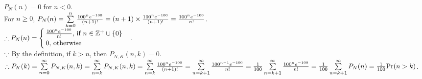 \begin{pr}
$P_N(n)=0$ for $n<0$.\\
For $n\geq0$, $P_N(n)=\sum\limits_{k=0}^n\frac{100^ne^{-100}}{(n+1)!}=(n+1)\times\frac{100^ne^{-100}}{(n+1)!}=\frac{100^ne^{-100}}{n!}$.\\
$\therefore P_N(n)=\begin{cases}
\frac{100^ne^{-100}}{n!}\text{, if }n\in\mathbb{Z}^+\cup\{0\}\\
0\text{, otherwise}
\end{cases}$.\\
$\because$ By the definition, if $k>n$, then $P_{N, K}(n, k)=0$.\\
$\therefore P_K(k)=\sum\limits_{n=0}^\infty P_{N, K}(n, k)=\sum\limits_{n=k}^\infty P_{N, K}(n, k)=\sum\limits_{n=k}^\infty\frac{100^ne^{-100}}{(n+1)!}=\sum\limits_{n=k+1}^\infty\frac{100^{n-1}e^{-100}}{n!}=\frac1{100}\sum\limits_{n=k+1}^\infty\frac{100^ne^{-100}}{n!}=\frac1{100}\sum\limits_{n=k+1}^\infty P_N(n)=\frac1{100}\mathrm{Pr}(n>k)$.
\end{pr}
